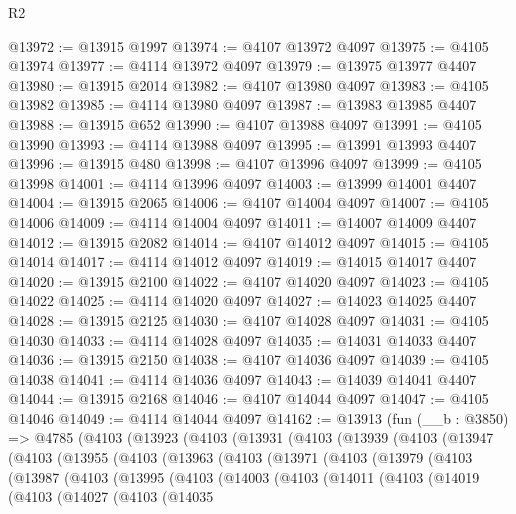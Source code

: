\begin{lexlean}{R2}
\begin{coremodule}
@13972 := @13915 @1997
@13974 := @4107 @13972 @4097
@13975 := @4105 @13974
@13977 := @4114 @13972 @4097
@13979 := @13975 @13977 @4407
@13980 := @13915 @2014
@13982 := @4107 @13980 @4097
@13983 := @4105 @13982
@13985 := @4114 @13980 @4097
@13987 := @13983 @13985 @4407
@13988 := @13915 @652
@13990 := @4107 @13988 @4097
@13991 := @4105 @13990
@13993 := @4114 @13988 @4097
@13995 := @13991 @13993 @4407
@13996 := @13915 @480
@13998 := @4107 @13996 @4097
@13999 := @4105 @13998
@14001 := @4114 @13996 @4097
@14003 := @13999 @14001 @4407
@14004 := @13915 @2065
@14006 := @4107 @14004 @4097
@14007 := @4105 @14006
@14009 := @4114 @14004 @4097
@14011 := @14007 @14009 @4407
@14012 := @13915 @2082
@14014 := @4107 @14012 @4097
@14015 := @4105 @14014
@14017 := @4114 @14012 @4097
@14019 := @14015 @14017 @4407
@14020 := @13915 @2100
@14022 := @4107 @14020 @4097
@14023 := @4105 @14022
@14025 := @4114 @14020 @4097
@14027 := @14023 @14025 @4407
@14028 := @13915 @2125
@14030 := @4107 @14028 @4097
@14031 := @4105 @14030
@14033 := @4114 @14028 @4097
@14035 := @14031 @14033 @4407
@14036 := @13915 @2150
@14038 := @4107 @14036 @4097
@14039 := @4105 @14038
@14041 := @4114 @14036 @4097
@14043 := @14039 @14041 @4407
@14044 := @13915 @2168
@14046 := @4107 @14044 @4097
@14047 := @4105 @14046
@14049 := @4114 @14044 @4097
@14162 := @13913
    (fun (__b : @3850) =>
    @4785
      (@4103
        (@13923
          (@4103
            (@13931
              (@4103
                (@13939
                  (@4103
                    (@13947
                      (@4103
                        (@13955
                          (@4103
                            (@13963
                              (@4103
                                (@13971
                                  (@4103
                                    (@13979
                                      (@4103
                                        (@13987
                                          (@4103
                                            (@13995
                                              (@4103
                                                (@14003
                                                  (@4103
                                                    (@14011
                                                      (@4103
                                                        (@14019
                                                          (@4103
                                                            (@14027
                                                              (@4103
                                                                (@14035

\end{coremodule}
\end{lexlean}
